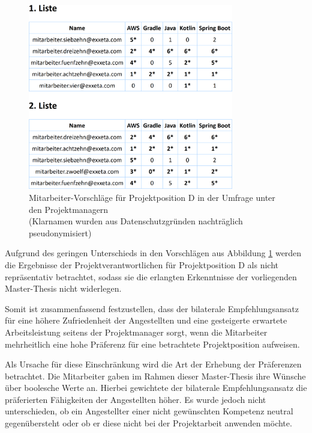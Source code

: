 \begin{figure}[h]
	\centering
	\includegraphics[width=0.8\textwidth]{gfx/projektposition-d.png}
	\caption[Mitarbeiter-Vorschläge für Projektposition D in der Umfrage unter den Projektmanagern]{Mitarbeiter-Vorschläge für Projektposition D in der Umfrage unter den Projektmanagern\\
	(Klarnamen wurden aus Datenschutzgründen nachträglich pseudonymisiert)}
	\label{fig:diskussion:interpretation:abb2}
\end{figure}

Aufgrund des geringen Unterschieds in den Vorschlägen aus Abbildung \ref{fig:diskussion:interpretation:abb2} werden die Ergebnisse der Projektverantwortlichen für Projektposition D als nicht repräsentativ betrachtet, sodass sie die erlangten Erkenntnisse der vorliegenden Master-Thesis nicht widerlegen.

Somit ist zusammenfassend festzustellen, dass der bilaterale Empfehlungsansatz für eine höhere Zufriedenheit der Angestellten und eine gesteigerte erwartete Arbeitsleistung seitens der Projektmanager sorgt, wenn die Mitarbeiter mehrheitlich eine hohe Präferenz für eine betrachtete Projektposition aufweisen.

Als Ursache für diese Einschränkung wird die Art der Erhebung der Präferenzen betrachtet. Die Mitarbeiter gaben im Rahmen dieser Master-Thesis ihre Wünsche über boolesche Werte an. Hierbei gewichtete der bilaterale Empfehlungsansatz die präferierten Fähigkeiten der Angestellten höher. Es wurde jedoch nicht unterschieden, ob ein Angestellter einer nicht gewünschten Kompetenz neutral gegenübersteht oder ob er diese nicht bei der Projektarbeit anwenden möchte.

